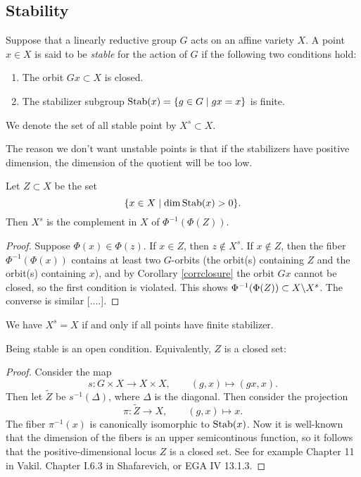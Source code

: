 \documentclass[11pt, english]{article}
\begin{document}
\subsection{Stability}

\begin{defi}
Suppose that a linearly reductive group $G$ acts on an affine variety $X$. A point $x \in X$ is said to be \emph{stable} for the action of $G$ if the following two conditions hold:
\begin{enumerate}
\item The orbit $Gx \subset X$ is closed.
\item The stabilizer subgroup $\text{Stab}(x) = \{ g \in G \mid gx=x\}$ is finite.
\end{enumerate}
We denote the set of all stable point by $X^s \subset X$.
\end{defi}

The reason we don't want unstable points is that if the stabilizers have positive dimension, the dimension of the quotient will be too low.

\begin{prop}
Let $Z \subset X$ be the set
\[
\{ x \in X \mid \dim \text{Stab}(x) > 0 \} .
\]
Then $X^s$ is the complement in $X$ of $\Phi^{-1}(\Phi(Z))$.
\end{prop}
\begin{proof}
Suppose $\Phi(x) \in \Phi(z)$. If $x \in Z$, then $z \not \in X^s$. If $x \not \in Z$, then the fiber $\Phi^{-1}(\Phi(x))$ contains at least two $G$-orbits (the orbit(s) containing $Z$ and the orbit(s) containing $x$), and by Corollary \ref{corrclosure} the orbit $Gx$ cannot be closed, so the first condition is violated. This shows $\Phi^{-1}(\Phi(Z)) \subset X \backslash X^s$. The converse is similar [....].
\end{proof}

\begin{remark}
We have $X^s=X$ if and only if all points have finite stabilizer.
\end{remark}

Being stable is an open condition. Equivalently, $Z$ is a closed set:
\begin{proof}
Consider the map
\[
s:G \times X \to X \times X, \qquad (g,x) \mapsto (gx,x).
\]
Then let $\widetilde{Z}$ be $s^{-1}(\Delta)$, where $\Delta$ is the diagonal. Then consider the projection
\[
\pi:\widetilde{Z} \to X, \qquad (g,x) \mapsto x.
\]
The fiber $\pi^{-1}(x)$ is canonically isomorphic to $\text{Stab}(x)$. Now it is well-known that the dimension of the fibers is an upper semicontinous function, so it follows that the positive-dimensional locus $Z$ is a closed set. See for example Chapter 11 in Vakil. Chapter I.6.3 in Shafarevich, or EGA IV 13.1.3.
\end{proof}
\end{document}

